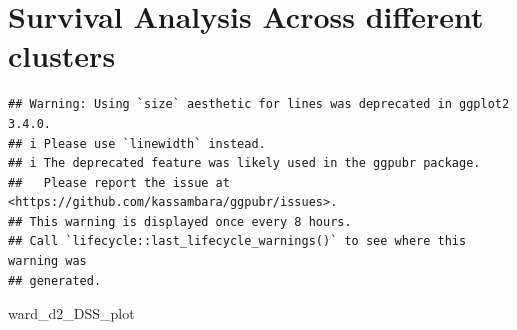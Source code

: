 \documentclass[
]{article}
\newenvironment{Shaded}{\begin{snugshade}}{\end{snugshade}}
\newcommand{\AttributeTok}[1]{\textcolor[rgb]{0.13,0.29,0.53}{#1}}
\newcommand{\CommentTok}[1]{\textcolor[rgb]{0.56,0.35,0.01}{\textit{#1}}}
\newcommand{\ConstantTok}[1]{\textcolor[rgb]{0.56,0.35,0.01}{#1}}
\newcommand{\DecValTok}[1]{\textcolor[rgb]{0.00,0.00,0.81}{#1}}
\newcommand{\FunctionTok}[1]{\textcolor[rgb]{0.13,0.29,0.53}{\textbf{#1}}}
\newcommand{\NormalTok}[1]{#1}
\newcommand{\OtherTok}[1]{\textcolor[rgb]{0.56,0.35,0.01}{#1}}
\newcommand{\SpecialCharTok}[1]{\textcolor[rgb]{0.81,0.36,0.00}{\textbf{#1}}}
\newcommand{\StringTok}[1]{\textcolor[rgb]{0.31,0.60,0.02}{#1}}
\begin{document}
\section{Survival Analysis Across different
clusters}\label{survival-analysis-across-different-clusters}

\begin{Shaded}
\end{Shaded}

\begin{verbatim}
## Warning: Using `size` aesthetic for lines was deprecated in ggplot2 3.4.0.
## i Please use `linewidth` instead.
## i The deprecated feature was likely used in the ggpubr package.
##   Please report the issue at <https://github.com/kassambara/ggpubr/issues>.
## This warning is displayed once every 8 hours.
## Call `lifecycle::last_lifecycle_warnings()` to see where this warning was
## generated.
\end{verbatim}

\begin{Shaded}
\begin{Highlighting}[]
\NormalTok{ward\_d2\_DSS\_plot}
\end{Highlighting}
\end{Shaded}
\end{document}
